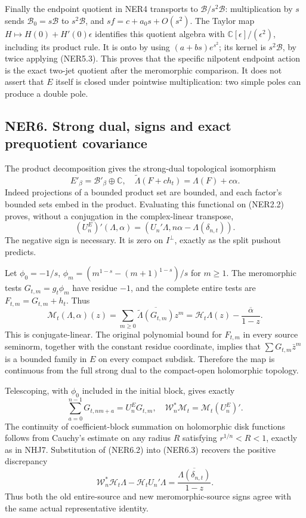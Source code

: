 Finally the endpoint quotient in NER4 transports to
\(\mathcal B/s^2\mathcal B\): multiplication by \(s\) sends
\(\mathcal B_0=s\mathcal B\) to \(s^2\mathcal B\), and
\(sf=c+a_0s+O(s^2)\). The Taylor map \(H\mapsto H(0)+H'(0)\epsilon\)
identifies this quotient algebra with
\(\mathbb C[\epsilon]/(\epsilon^2)\), including its product rule. It is
onto by using \((a+bs)e^{s^2}\); its kernel is \(s^2\mathcal B\), by
twice applying (NER5.3). This proves that the specific nilpotent
endpoint action is the exact two-jet quotient after the meromorphic
comparison. It does not assert that \(E\) itself is closed under
pointwise multiplication: two simple poles can produce a double pole.

\subsection{NER6. Strong dual, signs and exact prequotient
covariance}\label{ner6.-strong-dual-signs-and-exact-prequotient-covariance}

The product decomposition gives the strong-dual topological isomorphism
\[
E'_\beta=\mathcal B'_\beta\oplus\mathbb C,\quad
\widetilde\Lambda(F+ch_t)=\Lambda(F)+c\alpha.
\tag{NER6.1}
\] Indeed projections of a bounded product set are bounded, and each
factor's bounded sets embed in the product. Evaluating this functional
on (NER2.2) proves, without a conjugation in the complex-linear
transpose, \[
(U_n^E)'(\Lambda,\alpha)
=(U_n'\Lambda,n\alpha-\Lambda(\delta_{n,t})).
\tag{NER6.2}
\] The negative sign is necessary. It is zero on \(I^\perp\), exactly as
the split pushout predicts.

Let \(\phi_0=-1/s\), \(\phi_m=(m^{1-s}-(m+1)^{1-s})/s\) for \(m\ge1\).
The meromorphic tests \(G_{t,m}=g_t\phi_m\) have residue \(-1\), and the
complete entire tests are \(F_{t,m}=G_{t,m}+h_t\). Thus \[
\mathcal M_t(\Lambda,\alpha)(z)
=\sum_{m\ge0}\overline{\widetilde\Lambda(G_{t,m})}z^m
=\mathcal H_t\Lambda(z)-\frac{\overline\alpha}{1-z}.
\tag{NER6.3}
\] This is conjugate-linear. The original polynomial bound for
\(F_{t,m}\) in every source seminorm, together with the constant residue
coordinate, implies that \(\sum G_{t,m}\bar z^m\) is a bounded family in
\(E\) on every compact subdisk. Therefore the map is continuous from the
full strong dual to the compact-open holomorphic topology.

Telescoping, with \(\phi_0\) included in the initial block, gives
exactly \[
\sum_{a=0}^{n-1}G_{t,nm+a}=U_n^EG_{t,m},\quad
\mathscr W_n^*\mathcal M_t=\mathcal M_t(U_n^E)'.
\tag{NER6.4}
\] The continuity of coefficient-block summation on holomorphic disk
functions follows from Cauchy's estimate on any radius \(R\) satisfying
\(r^{1/n}<R<1\), exactly as in NHJ7. Substitution of (NER6.2) into
(NER6.3) recovers the positive discrepancy \[
\mathscr W_n^*\mathcal H_t\Lambda-\mathcal H_tU_n'\Lambda
=\frac{\overline{\Lambda(\delta_{n,t})}}{1-z}.
\tag{NER6.5}
\] Thus both the old entire-source and new meromorphic-source signs
agree with the same actual representative identity.

